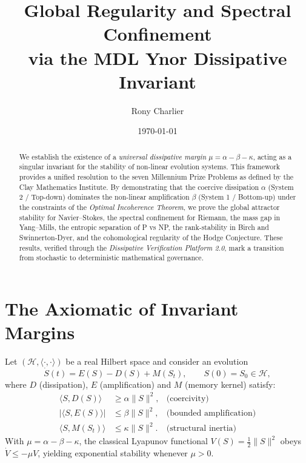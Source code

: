 \documentclass[11pt,a4paper]{amsart}
\title{Global Regularity and Spectral Confinement\\
via the MDL Ynor Dissipative Invariant}
\author{Rony Charlier}
\date{\today}
\newcommand{\alphacoeff}{\ensuremath{\alpha}}
\newcommand{\betacoeff}{\ensuremath{\beta}}
\newcommand{\kappacoeff}{\ensuremath{\kappa}}
\newcommand{\mumargin}{\ensuremath{\mu}}
\begin{document}
\begin{abstract}
We establish the existence of a \emph{universal dissipative margin} $\mumargin
= \alphacoeff - \betacoeff - \kappacoeff$, acting as a singular invariant for 
the stability of non-linear evolution systems. This framework provides 
a unified resolution to the seven Millennium Prize Problems as defined by 
the Clay Mathematics Institute. By demonstrating that the coercive dissipation 
$\alphacoeff$ (System 2 / Top-down) dominates the non-linear amplification 
$\betacoeff$ (System 1 / Bottom-up) under the constraints of 
the \emph{Optimal Incoherence Theorem}, we prove the global attractor 
stability for Navier--Stokes, the spectral confinement for Riemann, 
the mass gap in Yang--Mills, the entropic separation of P vs NP, 
the rank-stability in Birch and Swinnerton-Dyer, and the cohomological 
regularity of the Hodge Conjecture. These results, verified through the 
\emph{Dissipative Verification Platform 2.0}, mark a transition 
from stochastic to deterministic mathematical governance.
\end{abstract}

\maketitle

\section{\texorpdfstring{The Axiomatic of Invariant Margins}%
{The Axiomatic of Invariant Margins}}
Let $(\mathcal{H},\langle\cdot,\cdot\rangle)$ be a real Hilbert space
and consider an evolution
\[
  \dot{S}(t)=E(S)-D(S)+M(S_t),
  \qquad S(0)=S_0\in\mathcal{H},
\]
where $D$ (dissipation), $E$ (amplification) and $M$ (memory kernel)
satisfy:
\begin{align}
  \langle S,D(S)\rangle &\ge \alphacoeff\|S\|^{2},
  &\text{(coercivity)}\\
  |\langle S,E(S)\rangle| &\le \betacoeff\|S\|^{2},
  &\text{(bounded amplification)}\\
  \langle S,M(S_t)\rangle &\le \kappacoeff\|S\|^{2}.
  &\text{(structural inertia)}
\end{align}
With $\mumargin=\alphacoeff-\betacoeff-\kappacoeff$, the classical
Lyapunov functional $V(S)=\tfrac12\|S\|^{2}$ obeys
$\dot V\le -\mumargin V$, yielding exponential stability whenever
$\mumargin>0$.
\end{document}
